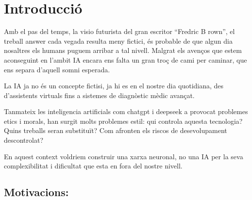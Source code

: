 \chapter{Introducció}
\label{c:intro}

Amb el pas del temps, la visio futurista del gran escritor ``Fredric B rown'', el treball answer cada vegada resulta meny fictici, és probable de que algun dia nosaltres els humans puguem arribar a tal nivell. Malgrat els avenços que estem aconseguint en l'ambit IA encara ens falta un gran troç de cami per caminar, que ens separa d'aquell somni esperada.

La IA ja no és un concepte fictisi, ja hi es en el nostre dia quotidiana, des d’assistents virtuals fins a sistemes de diagnòstic mèdic avançat.

Tanmateix les inteligencia artificials com chatgpt i deepseek a provocat problemes etics i morals, han surgit molts problemes estil: qui controla aquesta tecnologia? Quins treballs seran substituït? Com afronten els riscos de desevolupament descontrolat?

En aquest context voldriem construir una xarxa neuronal, no una IA per la seva complexibilitat i dificultat que esta en fora del nostre nivell.

\section{Motivacions:}




